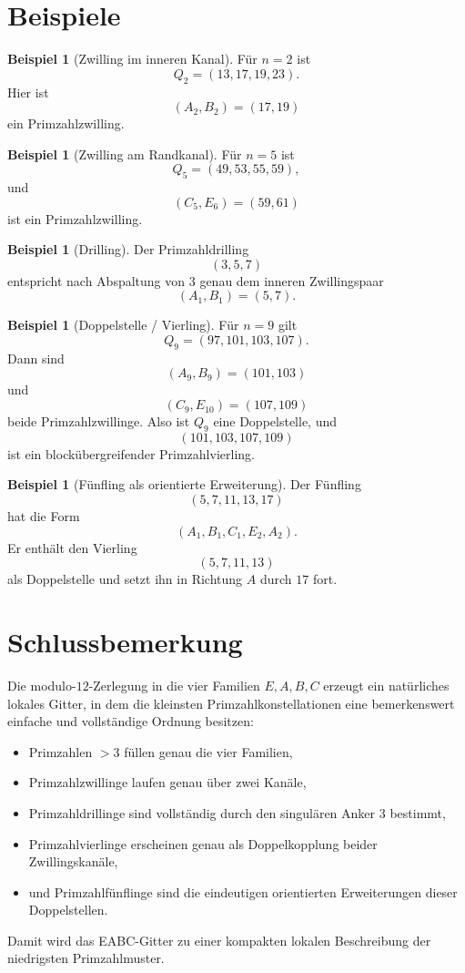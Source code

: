 \documentclass[11pt,a4paper]{article}
\theoremstyle{definition}
\newtheorem{beispiel}[satz]{Beispiel}
\theoremstyle{remark}
\begin{document}
	\section{Beispiele}
	
	\begin{beispiel}[Zwilling im inneren Kanal]
		Für \(n=2\) ist
		\[
		Q_2=(13,17,19,23).
		\]
		Hier ist
		\[
		(A_2,B_2)=(17,19)
		\]
		ein Primzahlzwilling.
	\end{beispiel}
	
	\begin{beispiel}[Zwilling am Randkanal]
		Für \(n=5\) ist
		\[
		Q_5=(49,53,55,59),
		\]
		und
		\[
		(C_5,E_6)=(59,61)
		\]
		ist ein Primzahlzwilling.
	\end{beispiel}
	
	\begin{beispiel}[Drilling]
		Der Primzahldrilling
		\[
		(3,5,7)
		\]
		entspricht nach Abspaltung von \(3\) genau dem inneren Zwillingspaar
		\[
		(A_1,B_1)=(5,7).
		\]
	\end{beispiel}
	
	\begin{beispiel}[Doppelstelle / Vierling]
		Für \(n=9\) gilt
		\[
		Q_9=(97,101,103,107).
		\]
		Dann sind
		\[
		(A_9,B_9)=(101,103)
		\]
		und
		\[
		(C_9,E_{10})=(107,109)
		\]
		beide Primzahlzwillinge. Also ist \(Q_9\) eine Doppelstelle, und
		\[
		(101,103,107,109)
		\]
		ist ein blockübergreifender Primzahlvierling.
	\end{beispiel}
	
	\begin{beispiel}[Fünfling als orientierte Erweiterung]
		Der Fünfling
		\[
		(5,7,11,13,17)
		\]
		hat die Form
		\[
		(A_1,B_1,C_1,E_2,A_2).
		\]
		Er enthält den Vierling
		\[
		(5,7,11,13)
		\]
		als Doppelstelle und setzt ihn in Richtung \(A\) durch \(17\) fort.
	\end{beispiel}
	
	\section{Schlussbemerkung}
	
	Die modulo-\(12\)-Zerlegung in die vier Familien \(E,A,B,C\) erzeugt ein natürliches lokales
	Gitter, in dem die kleinsten Primzahlkonstellationen eine bemerkenswert einfache und vollständige
	Ordnung besitzen:
	
	\begin{itemize}[itemsep=0.25em]
		\item Primzahlen \(>3\) füllen genau die vier Familien,
		\item Primzahlzwillinge laufen genau über zwei Kanäle,
		\item Primzahldrillinge sind vollständig durch den singulären Anker \(3\) bestimmt,
		\item Primzahlvierlinge erscheinen genau als Doppelkopplung beider Zwillingskanäle,
		\item und Primzahlfünflinge sind die eindeutigen orientierten Erweiterungen dieser Doppelstellen.
	\end{itemize}
	
	Damit wird das EABC-Gitter zu einer kompakten lokalen Beschreibung der niedrigsten
	Primzahlmuster.
	
\end{document}

